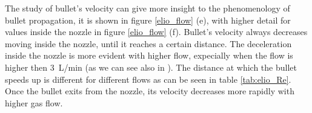 The study of bullet's velocity can give more insight to the phenomenology of bullet propagation, it is shown in figure \ref{elio_flow} (e), with higher detail for values inside the nozzle in figure \ref{elio_flow} (f). Bullet's velocity always decreases moving inside the nozzle, until it reaches a certain distance. The deceleration inside the nozzle is more evident with higher flow, expecially when the flow is higher then \SI{3}{\liter/\minute} (as we can see also in \cite{Jarrige_2010}). The distance at which the bullet speeds up is different for different flows as can be seen in table \ref{tab:elio_Re}.
Once the bullet exits from the nozzle, its velocity decreases more rapidly with higher gas flow.

